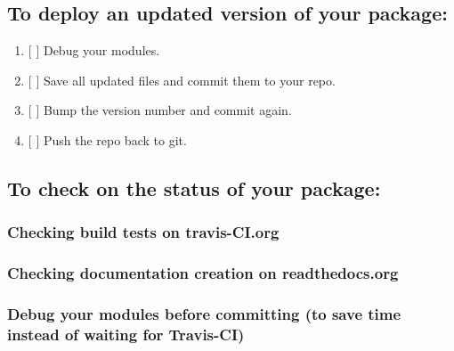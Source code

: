 \documentclass[11pt]{article}
\providecommand{\tightlist}{%
      \setlength{\itemsep}{0pt}\setlength{\parskip}{0pt}}
\begin{document}
\hypertarget{to-deploy-an-updated-version-of-your-package}{%
\subsection{To deploy an updated version of your
package:}\label{to-deploy-an-updated-version-of-your-package}}

\begin{enumerate}
\def\labelenumi{\arabic{enumi}.}
\tightlist
\item
  {[} {]} Debug your modules.
\item
  {[} {]} Save all updated files and commit them to your repo.
\item
  {[} {]} Bump the version number and commit again.
\item
  {[} {]} Push the repo back to git.
\end{enumerate}

\hypertarget{to-check-on-the-status-of-your-package}{%
\subsection{To check on the status of your
package:}\label{to-check-on-the-status-of-your-package}}

\hypertarget{checking-build-tests-on-travis-ci.org}{%
\subsubsection{Checking build tests on
travis-CI.org}\label{checking-build-tests-on-travis-ci.org}}

\hypertarget{checking-documentation-creation-on-readthedocs.org}{%
\subsubsection{Checking documentation creation on
readthedocs.org}\label{checking-documentation-creation-on-readthedocs.org}}

\hypertarget{debug-your-modules-before-committing-to-save-time-instead-of-waiting-for-travis-ci}{%
\subsubsection{Debug your modules before committing (to save time
instead of waiting for
Travis-CI)}\label{debug-your-modules-before-committing-to-save-time-instead-of-waiting-for-travis-ci}}
\end{document}
